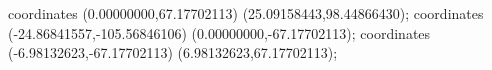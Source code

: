  coordinates {(0.00000000,67.17702113) (25.09158443,98.44866430)};
 coordinates {(-24.86841557,-105.56846106) (0.00000000,-67.17702113)};
 coordinates {(-6.98132623,-67.17702113) (6.98132623,67.17702113)};
